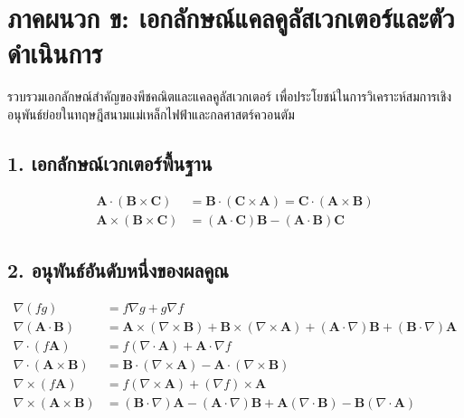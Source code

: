 \chapter*{ภาคผนวก ข: เอกลักษณ์แคลคูลัสเวกเตอร์และตัวดำเนินการ}

รวบรวมเอกลักษณ์สำคัญของพีชคณิตและแคลคูลัสเวกเตอร์ เพื่อประโยชน์ในการวิเคราะห์สมการเชิงอนุพันธ์ย่อยในทฤษฎีสนามแม่เหล็กไฟฟ้าและกลศาสตร์ควอนตัม

\vspace{0.4cm}
\section*{1. เอกลักษณ์เวกเตอร์พื้นฐาน}
\begin{align}
\mathbf{A} \cdot (\mathbf{B} \times \mathbf{C}) &= \mathbf{B} \cdot (\mathbf{C} \times \mathbf{A}) = \mathbf{C} \cdot (\mathbf{A} \times \mathbf{B}) \\
\mathbf{A} \times (\mathbf{B} \times \mathbf{C}) &= (\mathbf{A} \cdot \mathbf{C})\mathbf{B} - (\mathbf{A} \cdot \mathbf{B})\mathbf{C}
\end{align}

\vspace{0.2cm}
\section*{2. อนุพันธ์อันดับหนึ่งของผลคูณ}
\begin{align}
\nabla(fg) &= f\nabla g + g\nabla f \\
\nabla(\mathbf{A} \cdot \mathbf{B}) &= \mathbf{A} \times (\nabla \times \mathbf{B}) + \mathbf{B} \times (\nabla \times \mathbf{A}) + (\mathbf{A} \cdot \nabla)\mathbf{B} + (\mathbf{B} \cdot \nabla)\mathbf{A} \\
\nabla \cdot (f\mathbf{A}) &= f(\nabla \cdot \mathbf{A}) + \mathbf{A} \cdot \nabla f \\
\nabla \cdot (\mathbf{A} \times \mathbf{B}) &= \mathbf{B} \cdot (\nabla \times \mathbf{A}) - \mathbf{A} \cdot (\nabla \times \mathbf{B}) \\
\nabla \times (f\mathbf{A}) &= f(\nabla \times \mathbf{A}) + (\nabla f) \times \mathbf{A} \\
\nabla \times (\mathbf{A} \times \mathbf{B}) &= (\mathbf{B} \cdot \nabla)\mathbf{A} - (\mathbf{A} \cdot \nabla)\mathbf{B} + \mathbf{A}(\nabla \cdot \mathbf{B}) - \mathbf{B}(\nabla \cdot \mathbf{A})
\end{align}

